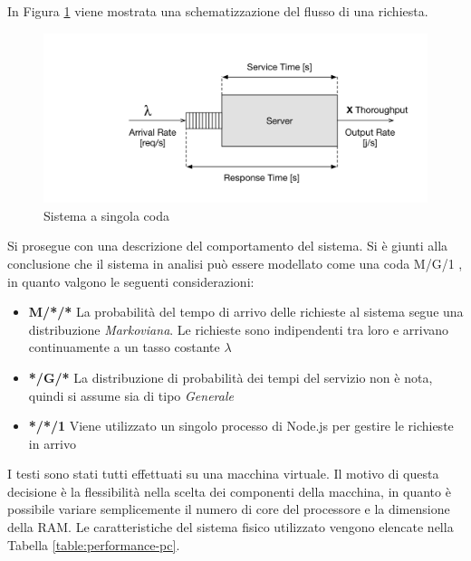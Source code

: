 In Figura \ref{fig:sistema-coda} viene mostrata una schematizzazione del flusso di una richiesta.

\begin{figure}[ht]
	\centering
	\includegraphics[width=\textwidth]{7-performance/Immagini/sistema_coda.png}
	\caption{Sistema a singola coda}\label{fig:sistema-coda}
\end{figure}

Si prosegue con una descrizione del comportamento del sistema. Si è giunti alla conclusione che il sistema in analisi può essere modellato come una coda M/G/1 \cite{sundarapandian2009probability}, in quanto valgono le seguenti considerazioni:

\begin{itemize}
	\item \textbf{M/*/*}
	La probabilità del tempo di arrivo delle richieste al sistema segue una distribuzione \emph{Markoviana}. Le richieste sono indipendenti tra loro e arrivano continuamente a un tasso costante $ \lambda $
	\item \textbf{*/G/*}
	La distribuzione di probabilità dei tempi del servizio non è nota, quindi si assume sia di tipo \emph{Generale}
	\item \textbf{*/*/1}
	Viene utilizzato un singolo processo di Node.js per gestire le richieste in arrivo
\end{itemize}

I testi sono stati tutti effettuati su una macchina virtuale. Il motivo di questa decisione è la flessibilità nella scelta dei componenti della macchina, in quanto è possibile variare semplicemente il numero di core del processore e la dimensione della RAM. Le caratteristiche del sistema fisico utilizzato vengono elencate nella Tabella \ref{table:performance-pc}.

